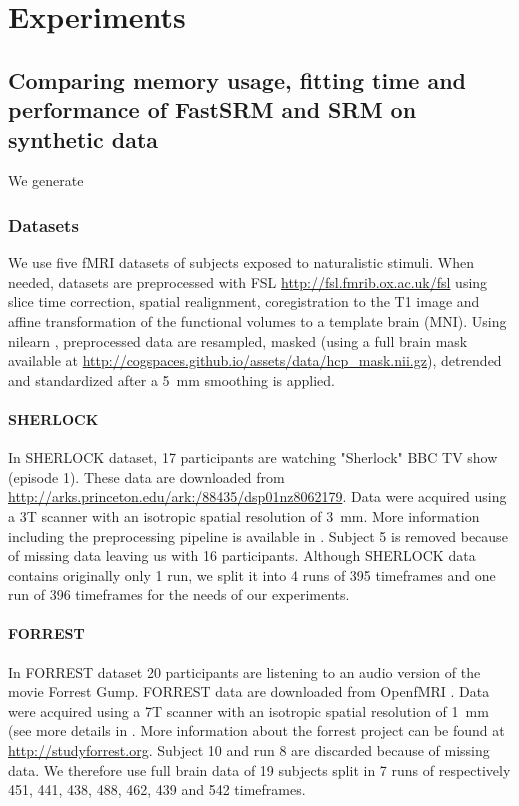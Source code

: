 \section{Experiments}
\subsection{Comparing memory usage, fitting time and performance of FastSRM and
  SRM on synthetic data}
We generate




\subsubsection{Datasets}

We use five fMRI datasets of subjects exposed to naturalistic stimuli. When needed, datasets are preprocessed with FSL \url{http://fsl.fmrib.ox.ac.uk/fsl} using slice time correction, spatial realignment, coregistration to the T1 image and affine transformation of the functional volumes to a template brain (MNI). Using nilearn \cite{abraham2014machine}, preprocessed data are resampled, masked (using a full brain mask available at \url{http://cogspaces.github.io/assets/data/hcp_mask.nii.gz}), detrended and standardized after a 5 mm smoothing is applied.  
%
\paragraph{SHERLOCK}
In SHERLOCK dataset, 17 participants are watching "Sherlock" BBC TV show (episode 1). 
%
These data are downloaded from \url{http://arks.princeton.edu/ark:/88435/dsp01nz8062179}. 
%
Data were acquired using a 3T scanner with an isotropic spatial resolution of 3 mm. 
%
More information including the preprocessing pipeline is available in \cite{sherlock}.
%
Subject 5 is removed because of missing data leaving us with 16 participants.
%
Although SHERLOCK data contains originally only 1 run, we split it into 4 runs of 395 timeframes and one run of 396 timeframes for the needs of our experiments. 


\paragraph{FORREST}
In FORREST dataset 20 participants are listening to an audio version of the movie Forrest Gump.
%
FORREST data are downloaded from OpenfMRI \cite{poldrack2013toward}. 
%
Data were acquired using a 7T scanner with an isotropic spatial resolution of 1 mm (see more details in \cite{hanke2014high}.
%
More information about the forrest project can be found at \url{http://studyforrest.org}.
%
Subject 10 and run 8 are discarded because of missing data.
%
We therefore use full brain data of 19 subjects split in 7 runs of respectively 451, 441, 438, 488, 462, 439 and 542 timeframes.
 

